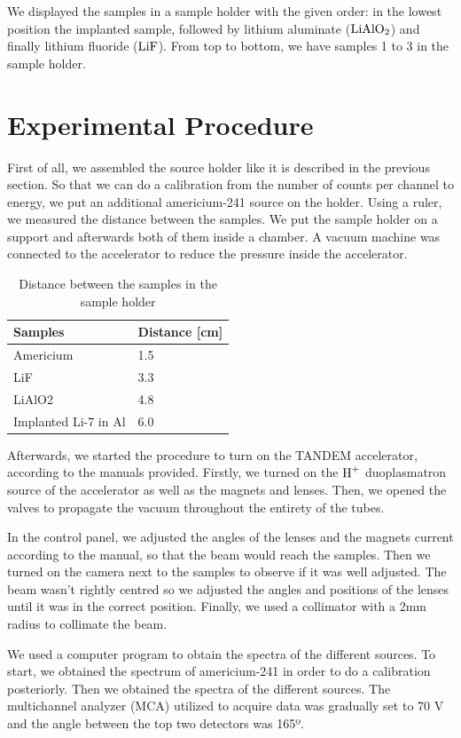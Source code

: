 \documentclass{article}
\begin{document}
We displayed the samples in a sample holder with the given order: in the lowest position the implanted sample, followed by lithium aluminate ($\ce{LiAlO2}$) and finally lithium fluoride ($\ce{LiF}$). From top to bottom, we have samples 1 to 3 in the sample holder.

\section{Experimental Procedure}

First of all, we assembled the source holder like it is described in the previous section. So that we can do a calibration from the number of counts per channel to energy, we put an additional americium-241 source on the holder.
Using a ruler, we measured the distance between the samples. We put the sample holder on a support and afterwards both of them inside a chamber. A vacuum machine was connected to the accelerator to reduce the pressure inside the accelerator. 

\begin{table}[h!]
\centering
\begin{tabular}{|w{2cm}|w{4cm}|}
\hline
Samples & Distance [cm]  \\ \hline
Americium & 1.5  \\ \hline
LiF & 3.3 \\ \hline
LiAlO2 & 4.8  \\ \hline
Implanted Li-7 in Al & 6.0  \\ \hline
\end{tabular}
\caption{Distance between the samples in the sample holder}
\label{tab:samples}
\end{table}

Afterwards, we started the procedure to turn on the TANDEM accelerator, according to the manuals provided. Firstly, we turned on the $\ce{H^+}$ duoplasmatron source of the accelerator as well as the magnets and lenses. Then, we opened the valves to propagate the vacuum throughout the entirety of the tubes.

In the control panel, we adjusted the angles of the lenses and the magnets current according to the manual, so that the beam would reach the samples. Then we turned on the camera next to the samples to observe if it was well adjusted. The beam wasn't rightly centred so we adjusted the angles and positions of the lenses until it was in the correct position. Finally, we used a collimator with a 2mm radius to collimate the beam. 
    
We used a computer program to obtain the spectra of the different sources. To start, we obtained the spectrum of americium-241 in order to do a calibration posteriorly. Then we obtained the spectra of the different sources. The multichannel analyzer (MCA) utilized to acquire data was gradually set to 70 V and the angle between the top two detectors was 165º. 
\end{document}
